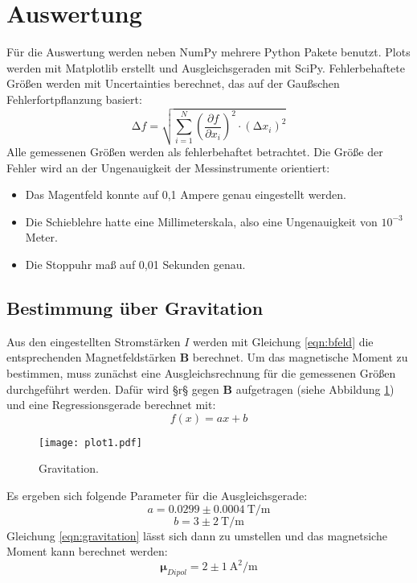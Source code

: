 \section{Auswertung}
\label{sec:Auswertung}

Für die Auswertung werden neben NumPy\cite{numpy} mehrere Python Pakete benutzt.
Plots werden mit Matplotlib\cite{matplotlib} erstellt und Ausgleichsgeraden mit SciPy\cite{scipy}.
Fehlerbehaftete Größen werden mit Uncertainties\cite{uncertainties} berechnet, das auf der Gaußschen Fehlerfortpflanzung basiert:
\begin{equation}
    \increment f = \sqrt{\sum_{i=1}^N \left( \frac{\partial f}{\partial x_i} \right)^{2} \cdot (\increment x_i)^{2}}
\end{equation}
Alle gemessenen Größen werden als fehlerbehaftet betrachtet.
Die Größe der Fehler wird an der Ungenauigkeit der Messinstrumente orientiert:
\begin{itemize}
  \item Das Magentfeld konnte auf 0,1 Ampere genau eingestellt werden.
  \item Die Schieblehre hatte eine Millimeterskala, also eine Ungenauigkeit von $10^{-3}$ Meter.
  \item Die Stoppuhr maß auf 0,01 Sekunden genau.
\end{itemize}

\subsection{Bestimmung über Gravitation}

Aus den eingestellten Stromstärken $I$ werden mit Gleichung \eqref{eqn:bfeld} die entsprechenden Magnetfeldstärken $\symbf{B}$ berechnet.
Um das magnetische Moment zu bestimmen,
muss zunächst eine Ausgleichsrechnung für die gemessenen Größen durchgeführt werden.
Dafür wird §r§ gegen $\symbf{B}$ aufgetragen (siehe Abbildung \ref{fig:plot1}) und eine Regressionsgerade berechnet mit:
\begin{equation}
  f(x) = ax+b
\end{equation}

\begin{figure}
  \centering
  \texttt{[image: plot1.pdf]}
  \caption{Gravitation.}
  \label{fig:plot1}
\end{figure}

Es ergeben sich folgende Parameter für die Ausgleichsgerade:
\begin{equation}
  a = 0.0299 \pm 0.0004 \: \text{T/m}
\end{equation}
\begin{equation}
  b = 3 \pm 2 \: \text{T/m}
\end{equation}
Gleichung \eqref{eqn:gravitation} lässt sich dann zu umstellen und das magnetsiche Moment kann berechnet werden:
\begin{equation}
  \symbf{\mu}_{Dipol} = 2 \pm 1 \: \text{A}^{2}/\text{m}
\end{equation}

